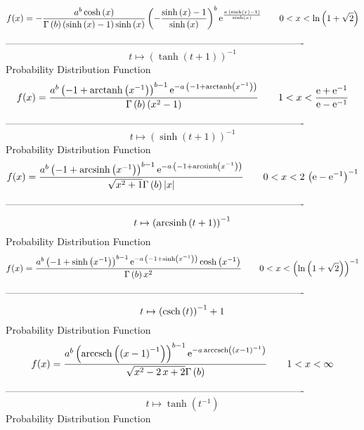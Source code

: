 \documentclass[12pt]{article}
\begin{document}
$$  f(x)=-{\frac {{a}^{b}\cosh \left( x \right) }{\Gamma \left( b \right) 
 \left( \sinh \left( x \right) -1 \right) \sinh \left( x \right) }
 \left( -{\frac {\sinh \left( x \right) -1}{\sinh \left( x \right) }}
 \right) ^{b}{{\rm e}^{{\frac {a\, \left( \sinh \left( x \right) -1
 \right) }{\sinh \left( x \right) }}}}}
 \qquad0
 < x < \ln  \left( 1+\sqrt {2} \right) 
$$-------------------------------------------------------------------------------------------  \\$$t\mapsto  \left( \tanh \left( t+1 \right)  \right) ^{-1}
$$Probability Distribution Function 
$$  f(x)={\frac {{a}^{b} \left( -1+{\rm arctanh} \left({x}^{-1}\right) \right) 
^{b-1}{{\rm e}^{-a\, \left( -1+{\rm arctanh} \left({x}^{-1}\right)
 \right) }}}{\Gamma \left( b \right)  \left( {x}^{2}-1 \right) }}
 \qquad1
 < x < {\frac {{\rm e}+{{\rm e}^{-1}}}{{\rm e}-{{\rm e}^{-1}}}}
$$-------------------------------------------------------------------------------------------  \\$$t\mapsto  \left( \sinh \left( t+1 \right)  \right) ^{-1}
$$Probability Distribution Function 
$$  f(x)={\frac {{a}^{b} \left( -1+{\rm arcsinh} \left({x}^{-1}\right) \right) 
^{b-1}{{\rm e}^{-a\, \left( -1+{\rm arcsinh} \left({x}^{-1}\right)
 \right) }}}{\sqrt {{x}^{2}+1}\Gamma \left( b \right)  \left| x
 \right| }}
 \qquad0
 < x < 2\, \left( {\rm e}-{{\rm e}^{-1}} \right) ^{-1}
$$-------------------------------------------------------------------------------------------  \\$$t\mapsto  \left( {\rm arcsinh} \left(t+1\right) \right) ^{-1}
$$Probability Distribution Function 
$$  f(x)={\frac {{a}^{b} \left( -1+\sinh \left( {x}^{-1} \right)  \right) ^{b-1
}{{\rm e}^{-a\, \left( -1+\sinh \left( {x}^{-1} \right)  \right) }}
\cosh \left( {x}^{-1} \right) }{\Gamma \left( b \right) {x}^{2}}}
 \qquad0
 < x <  \left( \ln  \left( 1+\sqrt {2} \right)  \right) ^{-1}
$$-------------------------------------------------------------------------------------------  \\$$t\mapsto  \left( {\rm csch} \left(t\right) \right) ^{-1}+1
$$Probability Distribution Function 
$$  f(x)={\frac {{a}^{b} \left( {\rm arccsch} \left( \left( x-1 \right) ^{-1}
\right) \right) ^{b-1}{{\rm e}^{-a\,{\rm arccsch} \left( \left( x-1
 \right) ^{-1}\right)}}}{\sqrt {{x}^{2}-2\,x+2}\Gamma \left( b
 \right) }}
 \qquad1
 < x < \infty 
$$-------------------------------------------------------------------------------------------  \\$$t\mapsto \tanh \left( {t}^{-1} \right) 
$$Probability Distribution Function 
\end{document}
